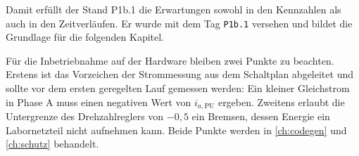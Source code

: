 Damit erfüllt der Stand P1b.1 die Erwartungen sowohl in den Kennzahlen als auch in den
Zeitverläufen. Er wurde mit dem Tag \texttt{P1b.1} versehen und bildet die Grundlage für die
folgenden Kapitel.

Für die Inbetriebnahme auf der Hardware bleiben zwei Punkte zu beachten. Erstens ist das
Vorzeichen der Strommessung aus dem Schaltplan abgeleitet und sollte vor dem ersten geregelten
Lauf gemessen werden: Ein kleiner Gleichstrom in Phase A muss einen negativen Wert von
$i_{a,\mathrm{PU}}$ ergeben. Zweitens erlaubt die Untergrenze des Drehzahlreglers von $-0{,}5$
ein Bremsen, dessen Energie ein Labornetzteil nicht aufnehmen kann. Beide Punkte werden in
\cref{ch:codegen} und \cref{ch:schutz} behandelt.

